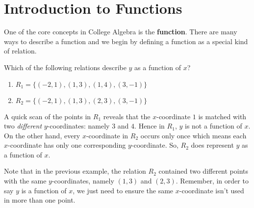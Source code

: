 \section{Introduction to Functions}
\label{IntrotoFunctions}

One of the core concepts in College Algebra is the \textbf{function}.  There are many ways to describe a function and we begin by defining a function as a special kind of relation.

\smallskip


\medskip

{
Which of the following relations describe $y$ as a function of $x$?

\begin{enumerate}

\item  $R_{1} = \{ (-2,1), (1,3), (1,4), (3,-1) \}$

\item  $R_{2} = \{ (-2,1), (1,3), (2,3), (3,-1) \}$

\end{enumerate}
}
{ 
A quick scan of the points in $R_{1}$ reveals that the $x$-coordinate $1$ is matched with two \emph{different} $y$-coordinates:  namely $3$ and $4$.  Hence in $R_{1}$, $y$ is not a function of $x$.  On the other hand, every $x$-coordinate in $R_{2}$ occurs only once which means each $x$-coordinate has only one corresponding $y$-coordinate.  So, $R_{2}$  does represent $y$ as a function of $x$.
}

\medskip

Note that in the previous example, the relation $R_{2}$ contained two different points with the same $y$-coordinates, namely $(1,3)$ and $(2,3)$. Remember, in order to say $y$ is a function of $x$, we just need to ensure the same $x$-coordinate isn't used in more than one point.





